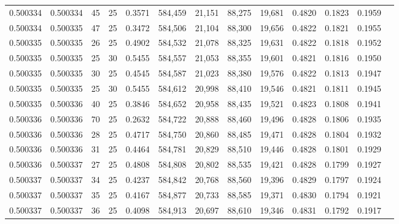 \begin{tabular}{rrrrrrrrrrrrr}
0.500334 & 0.500334 &    45 &  25 &                                     0.3571 & 584,459 &  21,151 &  88,275 &  19,681 & 0.4820 & 0.1823 & 0.1959 \\
0.500334 & 0.500335 &    47 &  25 &                                     0.3472 & 584,506 &  21,104 &  88,300 &  19,656 & 0.4822 & 0.1821 & 0.1955 \\
0.500335 & 0.500335 &    26 &  25 &                                     0.4902 & 584,532 &  21,078 &  88,325 &  19,631 & 0.4822 & 0.1818 & 0.1952 \\
0.500335 & 0.500335 &    25 &  30 &                                     0.5455 & 584,557 &  21,053 &  88,355 &  19,601 & 0.4821 & 0.1816 & 0.1950 \\
0.500335 & 0.500335 &    30 &  25 &                                     0.4545 & 584,587 &  21,023 &  88,380 &  19,576 & 0.4822 & 0.1813 & 0.1947 \\
0.500335 & 0.500335 &    25 &  30 &                                     0.5455 & 584,612 &  20,998 &  88,410 &  19,546 & 0.4821 & 0.1811 & 0.1945 \\
0.500335 & 0.500336 &    40 &  25 &                                     0.3846 & 584,652 &  20,958 &  88,435 &  19,521 & 0.4823 & 0.1808 & 0.1941 \\
0.500336 & 0.500336 &    70 &  25 &                                     0.2632 & 584,722 &  20,888 &  88,460 &  19,496 & 0.4828 & 0.1806 & 0.1935 \\
0.500336 & 0.500336 &    28 &  25 &                                     0.4717 & 584,750 &  20,860 &  88,485 &  19,471 & 0.4828 & 0.1804 & 0.1932 \\
0.500336 & 0.500336 &    31 &  25 &                                     0.4464 & 584,781 &  20,829 &  88,510 &  19,446 & 0.4828 & 0.1801 & 0.1929 \\
0.500336 & 0.500337 &    27 &  25 &                                     0.4808 & 584,808 &  20,802 &  88,535 &  19,421 & 0.4828 & 0.1799 & 0.1927 \\
0.500337 & 0.500337 &    34 &  25 &                                     0.4237 & 584,842 &  20,768 &  88,560 &  19,396 & 0.4829 & 0.1797 & 0.1924 \\
0.500337 & 0.500337 &    35 &  25 &                                     0.4167 & 584,877 &  20,733 &  88,585 &  19,371 & 0.4830 & 0.1794 & 0.1921 \\
0.500337 & 0.500337 &    36 &  25 &                                     0.4098 & 584,913 &  20,697 &  88,610 &  19,346 & 0.4831 & 0.1792 & 0.1917 \\

\end{tabular}
